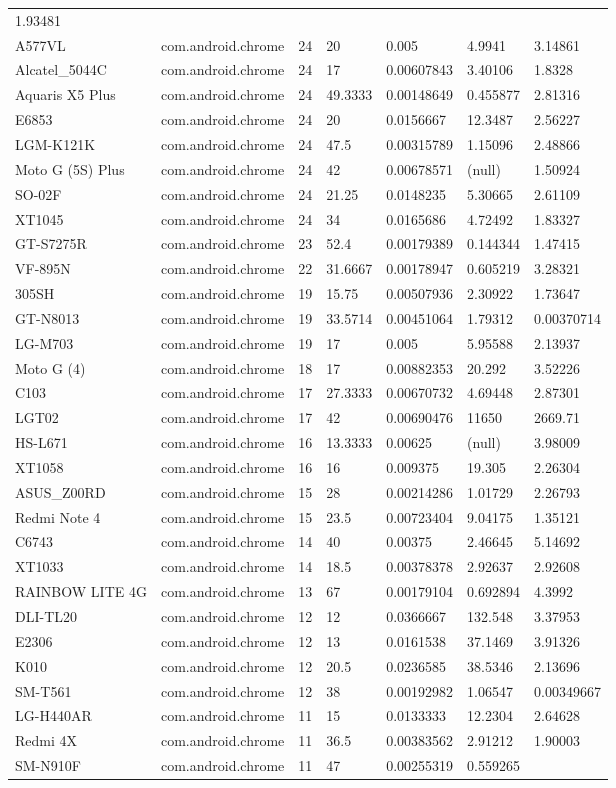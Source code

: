 \documentclass[
]{article}
\begin{document}
\begin{longtable}[]{@{}lllllll@{}}
1.93481\tabularnewline
A577VL & com.android.chrome & 24 & 20 & 0.005 & 4.9941 &
3.14861\tabularnewline
Alcatel\_5044C & com.android.chrome & 24 & 17 & 0.00607843 & 3.40106 &
1.8328\tabularnewline
Aquaris X5 Plus & com.android.chrome & 24 & 49.3333 & 0.00148649 &
0.455877 & 2.81316\tabularnewline
E6853 & com.android.chrome & 24 & 20 & 0.0156667 & 12.3487 &
2.56227\tabularnewline
LGM-K121K & com.android.chrome & 24 & 47.5 & 0.00315789 & 1.15096 &
2.48866\tabularnewline
Moto G (5S) Plus & com.android.chrome & 24 & 42 & 0.00678571 & (null) &
1.50924\tabularnewline
SO-02F & com.android.chrome & 24 & 21.25 & 0.0148235 & 5.30665 &
2.61109\tabularnewline
XT1045 & com.android.chrome & 24 & 34 & 0.0165686 & 4.72492 &
1.83327\tabularnewline
GT-S7275R & com.android.chrome & 23 & 52.4 & 0.00179389 & 0.144344 &
1.47415\tabularnewline
VF-895N & com.android.chrome & 22 & 31.6667 & 0.00178947 & 0.605219 &
3.28321\tabularnewline
305SH & com.android.chrome & 19 & 15.75 & 0.00507936 & 2.30922 &
1.73647\tabularnewline
GT-N8013 & com.android.chrome & 19 & 33.5714 & 0.00451064 & 1.79312 &
0.00370714\tabularnewline
LG-M703 & com.android.chrome & 19 & 17 & 0.005 & 5.95588 &
2.13937\tabularnewline
Moto G (4) & com.android.chrome & 18 & 17 & 0.00882353 & 20.292 &
3.52226\tabularnewline
C103 & com.android.chrome & 17 & 27.3333 & 0.00670732 & 4.69448 &
2.87301\tabularnewline
LGT02 & com.android.chrome & 17 & 42 & 0.00690476 & 11650 &
2669.71\tabularnewline
HS-L671 & com.android.chrome & 16 & 13.3333 & 0.00625 & (null) &
3.98009\tabularnewline
XT1058 & com.android.chrome & 16 & 16 & 0.009375 & 19.305 &
2.26304\tabularnewline
ASUS\_Z00RD & com.android.chrome & 15 & 28 & 0.00214286 & 1.01729 &
2.26793\tabularnewline
Redmi Note 4 & com.android.chrome & 15 & 23.5 & 0.00723404 & 9.04175 &
1.35121\tabularnewline
C6743 & com.android.chrome & 14 & 40 & 0.00375 & 2.46645 &
5.14692\tabularnewline
XT1033 & com.android.chrome & 14 & 18.5 & 0.00378378 & 2.92637 &
2.92608\tabularnewline
RAINBOW LITE 4G & com.android.chrome & 13 & 67 & 0.00179104 & 0.692894 &
4.3992\tabularnewline
DLI-TL20 & com.android.chrome & 12 & 12 & 0.0366667 & 132.548 &
3.37953\tabularnewline
E2306 & com.android.chrome & 12 & 13 & 0.0161538 & 37.1469 &
3.91326\tabularnewline
K010 & com.android.chrome & 12 & 20.5 & 0.0236585 & 38.5346 &
2.13696\tabularnewline
SM-T561 & com.android.chrome & 12 & 38 & 0.00192982 & 1.06547 &
0.00349667\tabularnewline
LG-H440AR & com.android.chrome & 11 & 15 & 0.0133333 & 12.2304 &
2.64628\tabularnewline
Redmi 4X & com.android.chrome & 11 & 36.5 & 0.00383562 & 2.91212 &
1.90003\tabularnewline
SM-N910F & com.android.chrome & 11 & 47 & 0.00255319 & 0.559265 &

\end{longtable}
\end{document}
